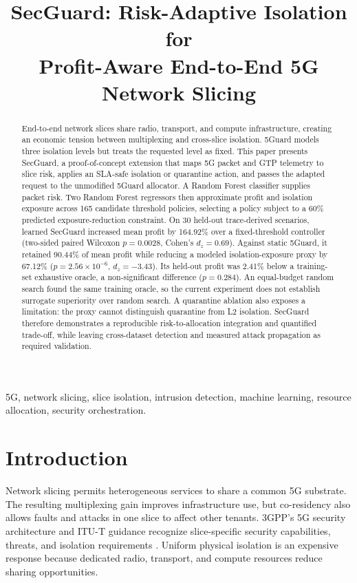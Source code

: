 \documentclass[conference]{IEEEtran}
\title{SecGuard: Risk-Adaptive Isolation for\\
Profit-Aware End-to-End 5G Network Slicing}
\author{\IEEEauthorblockN{Anonymous Author(s)}
\IEEEauthorblockA{Master's Thesis Project\\
Institution and email to be added}}
\begin{document}
\maketitle

\begin{abstract}
End-to-end network slices share radio, transport, and compute infrastructure,
creating an economic tension between multiplexing and cross-slice isolation.
5Guard models three isolation levels but treats the requested level as fixed.
This paper presents SecGuard, a proof-of-concept extension that maps 5G packet
and GTP telemetry to slice risk, applies an SLA-safe isolation or quarantine
action, and passes the adapted request to the unmodified 5Guard allocator. A
Random Forest classifier supplies packet risk. Two Random Forest regressors then
approximate profit and isolation exposure across 165 candidate threshold
policies, selecting a policy subject to a 60\% predicted exposure-reduction
constraint. On 30 held-out trace-derived scenarios, learned SecGuard increased
mean profit by 164.92\% over a fixed-threshold controller (two-sided paired
Wilcoxon $p=0.0028$, Cohen's $d_z=0.69$). Against static 5Guard, it retained
90.44\% of mean profit while reducing a modeled isolation-exposure proxy by
67.12\% ($p=2.56\times10^{-6}$, $d_z=-3.43$). Its held-out profit was 2.41\%
below a training-set exhaustive oracle, a non-significant difference
($p=0.284$). An equal-budget random search found the same training oracle, so
the current experiment does not establish surrogate superiority over random
search. A quarantine ablation also exposes a limitation: the proxy cannot
distinguish quarantine from L2 isolation. SecGuard therefore demonstrates a
reproducible risk-to-allocation integration and quantified trade-off, while
leaving cross-dataset detection and measured attack propagation as required
validation.
\end{abstract}

\begin{IEEEkeywords}
5G, network slicing, slice isolation, intrusion detection, machine learning,
resource allocation, security orchestration.
\end{IEEEkeywords}

\section{Introduction}
Network slicing permits heterogeneous services to share a common 5G substrate.
The resulting multiplexing gain improves infrastructure use, but co-residency
also allows faults and attacks in one slice to affect other tenants. 3GPP's 5G
security architecture and ITU-T guidance recognize slice-specific security
capabilities, threats, and isolation requirements
\cite{3gppts33501,itutx1814,itutx1816}. Uniform physical isolation is an
expensive response because dedicated radio, transport, and compute resources
reduce sharing opportunities.
\end{document}
